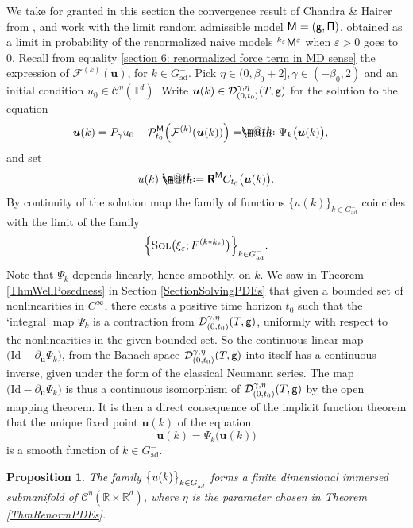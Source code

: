\documentclass[10pt, reqno]{amsart}
\makeatletter
\numberwithin{subsection}{section}
\numberwithin{subsubsection}{subsection}
\numberwithin{equation}{section} %
\theoremstyle{mystyle}
\newtheorem{prop}[thm]{\hspace{-0.13cm} {Proposition}}%
\theoremstyle{mystyle2}
\theoremstyle{mystyle3}
\newcommand{\mcF}{\boldsymbol{p}}
\newcommand{\bsu}{\boldsymbol{u}}
\renewcommand{\epsilon}{\varepsilon}
\newcommand\bbR{\mathbb{R}}
\newcommand{\bbT}{\mathbb{T}}
\newcommand{\mcC}{\mathcal{C}}
\newcommand{\mcD}{\mathcal{D}}
\renewcommand{\mcF}{\mathcal{F}}
\newcommand{\mcP}{\mathcal{P}}
\newcommand*{\defeq}{\mathrel{\rlap{%
                     \raisebox{0.3ex}{$\m@th\cdot$}}%
                     \raisebox{-0.3ex}{$\m@th\cdot$}}%
                     =}
\newcommand*{\eqdef}{=\mathrel{\rlap{%
                     \raisebox{0.3ex}{$\m@th\cdot$}}%
                     \raisebox{-0.3ex}{$\m@th\cdot$}}%
                     }
\makeatother
\begin{document}
We take for granted in this section the convergence result of Chandra \& Hairer from \cite{ChandraHairer}, and work with the limit random admissible model ${\sf M}=({\sf g},{\sf\Pi})$, obtained as a limit in probability of the renormalized naive models $^{k_\epsilon}{\sf M}^\epsilon$ when $\epsilon>0$ goes to $0$. Recall from equality \eqref{section 6: renormalized force term in MD sense} the expression of $\mcF^{(k)}(\bsu)$, for $k\in G^-_\textrm{ad}$. Pick $\eta\in(0,\beta_0+2], \gamma\in(-\beta_0,2)$ and an initial condition $u_0\in\mcC^\eta(\bbT^d)$. Write $\bsu(k)\in\mcD^{\gamma,\eta}_{(0,t_0)}(T,\sf g)$ for the solution to the equation
\begin{equation*} \begin{split}
\bsu(k) &= P_\gamma u_0+\mcP_{t_0}^{{\sf M}}\Big( \mcF^{(k)}(\bsu(k)) \Big)   \eqdef \Psi_k\big(\bsu(k)\big),
\end{split} \end{equation*}
and set
$$
u(k) \defeq  \textbf{\textsf{R}}^{\sf M}C_{t_0}\big(\bsu(k)\big).
$$ 
By continuity of the solution map the family of functions $\big\{u(k)\big\}_{k\in G^-_\textrm{ad}}$ coincides with the limit of the family 
$$
\Big\{\textsc{Sol}\big(\xi_\epsilon;F^{(k*k_\epsilon)}\big)\Big\}_{k\in G^-_\textrm{ad}}.
$$   
Note that $\Psi_k$ depends linearly, hence smoothly, on $k$. We saw in Theorem \ref{ThmWellPosedness} in Section \ref{SectionSolvingPDEs} that given a bounded set of nonlinearities in $C^\infty$, there exists a positive time 
horizon $t_0$ such that the `integral' map $\Psi_k$ is a contraction from $\mcD^{\gamma,\eta}_{(0,t_0)}(T,\sf g)$, uniformly with respect to the nonlinearities in the given bounded set. So the continuous linear map $\big(\textrm{Id}-\partial_{\bsu}\Psi_k\big)$, from the Banach space $\mcD^{\gamma,\eta}_{(0,t_0)}(T,\sf g)$ into itself has a continuous inverse, given under the form of the classical Neumann series. The map $\big(\textrm{Id}-\partial_{\bsu}\Psi_k\big)$ is thus a continuous isomorphism of $\mcD^{\gamma,\eta}_{(0,t_0)}(T,\sf g)$ by the open mapping theorem. It is then 
a direct consequence of the implicit function theorem that the unique fixed point $\bsu(k)$ of the equation
$$
\bsu(k) = \Psi_k\big(\bsu(k)\big)
$$
is a smooth function of $k\in G^-_{\textrm{ad}}$.

\medskip

\begin{prop} \label{PropSolutionManifold}
The family $\big\{u(k)\big\}_{k\in G^-_{\textrm{\emph{ad}}}}$ forms a finite dimensional immersed submanifold of $\mcC^\eta(\bbR\times\bbR^d)$, where $\eta$ is the parameter chosen in Theorem \ref{ThmRenormPDEs}.
\end{prop}   
\end{document}
